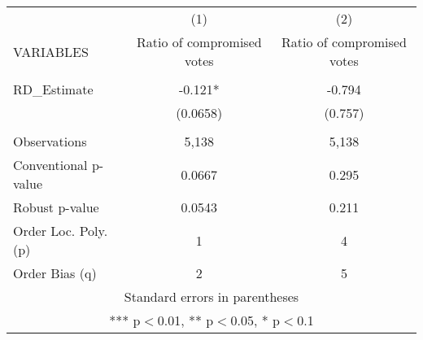 \begin{tabular}{lcc} \hline
 & (1) & (2) \\
VARIABLES & Ratio of compromised votes & Ratio of compromised votes \\ \hline
 &  &  \\
RD\_Estimate & -0.121* & -0.794 \\
 & (0.0658) & (0.757) \\
 &  &  \\
Observations & 5,138 & 5,138 \\
Conventional p-value & 0.0667 & 0.295 \\
Robust p-value & 0.0543 & 0.211 \\
Order Loc. Poly. (p) & 1 & 4 \\
 Order Bias (q) & 2 & 5 \\ \hline
\multicolumn{3}{c}{ Standard errors in parentheses} \\
\multicolumn{3}{c}{ *** p$<$0.01, ** p$<$0.05, * p$<$0.1} \\
\end{tabular}
